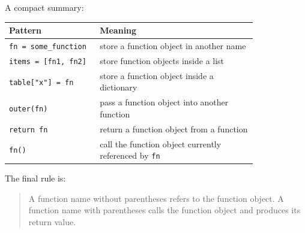 A compact summary:

\begin{center}
\begin{tabular}{|p{0.30\linewidth}|p{0.52\linewidth}|}
\hline
\textbf{Pattern} & \textbf{Meaning} \\
\hline
\texttt{fn = some\_function} & store a function object in another name \\
\hline
\texttt{items = [fn1, fn2]} & store function objects inside a list \\
\hline
\texttt{table["x"] = fn} & store a function object inside a dictionary \\
\hline
\texttt{outer(fn)} & pass a function object into another function \\
\hline
\texttt{return fn} & return a function object from a function \\
\hline
\texttt{fn()} & call the function object currently referenced by \texttt{fn} \\
\hline
\end{tabular}
\end{center}

The final rule is:

\begin{quote}
A function name without parentheses refers to the function object. A function name with parentheses calls the function object and produces its return value.
\end{quote}